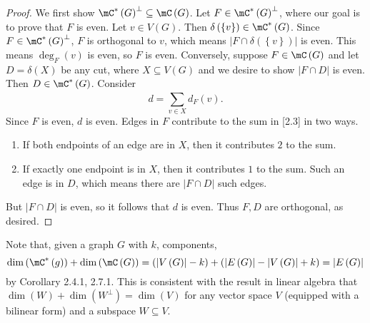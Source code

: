 \documentclass[co342]{subfiles}
\begin{document}
    \begin{proof}
        We first show $\mC^{*}\left( G \right)^\perp\subseteq\mC\left( G \right)$. Let $F\in\mC^{*}\left( G \right)^\perp$, where our goal is to prove that $F$ is even. Let $v\in V\left( G \right)$. Then $\delta\left( \left\lbrace v \right\rbrace \right)\in\mC^{*}\left( G \right)$. Since $F\in\mC^{*}\left( G \right)^\perp$, $F$ is orthogonal to $v$, which means $\left| F\cap\delta\left( \left\lbrace v \right\rbrace \right) \right|$ is even. This means $\deg_F\left( v \right)$ is even, so $F$ is even. Conversely, suppose $F\in\mC\left( G \right)$ and let $D=\delta\left( X \right)$ be any cut, where $X\subseteq V\left( G \right)$ and we desire to show $\left| F\cap D \right|$ is even. Then $D\in\mC^{*}\left( G \right)$. Consider
        \begin{equation}
            d = \sum^{}_{v\in X}d_F\left( v \right).
        \end{equation}
        Since $F$ is even, $d$ is even. Edges in $F$ contribute to the sum in [2.3] in two ways.
        \begin{enumerate}
            \item If both endpoints of an edge are in $X$, then it contributes $2$ to the sum.
            \item If exactly one endpoint is in $X$, then it contributes $1$ to the sum. Such an edge is in $D$, which means there are $\left| F\cap D \right|$ such edges.
        \end{enumerate}
        But $\left| F\cap D \right|$ is even, so it follows that $d$ is even. Thus $F,D$ are orthogonal, as desired.
    \end{proof}

    \np Note that, given a graph $G$ with $k$, components,
    \begin{equation*}
        \dim\left( \mC^{*}\left( g \right) \right) + \dim\left( \mC\left( G \right) \right) = \left( \left| V\left( G \right) \right|-k \right)+\left( \left| E\left( G \right) \right|-\left| V\left( G \right) \right|+k \right) = \left| E\left( G \right) \right|
    \end{equation*}
    by Corollary 2.4.1, 2.7.1. This is consistent with the result in linear algebra that $\dim\left( W \right)+\dim\left( W^\perp \right)=\dim\left( V \right)$ for any vector space $V$ (equipped with a bilinear form) and a subspace $W\subseteq V$.
    
    
    
    
    
    
    
    
    
    
    
    
    
    
    
    
    
    
    
    
    
    
    
    
    
    
    
    
    
    
    
    
    
    
    
    
    
    
    
    
    
    
\end{document}
